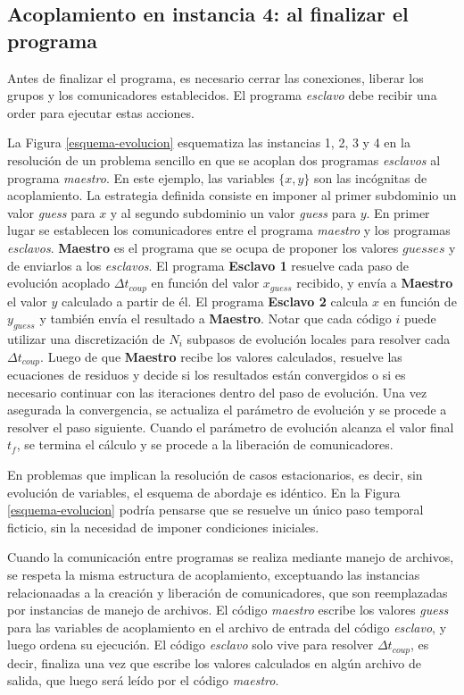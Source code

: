 \subsection*{Acoplamiento en instancia 4: al finalizar el programa}

Antes de finalizar el programa, es necesario cerrar las conexiones, liberar los grupos y los comunicadores establecidos.
El programa \textit{esclavo} debe recibir una order para ejecutar estas acciones.

\bigskip

La Figura \ref{esquema-evolucion} esquematiza las instancias 1, 2, 3 y 4 en la resolución de un problema sencillo
en que se acoplan dos programas \textit{esclavos} al programa \textit{maestro}.
En este ejemplo, las variables $\{x,y\}$ son las incógnitas de acoplamiento.
La estrategia definida consiste en imponer al primer subdominio un valor \textit{guess} para $x$ y al segundo subdominio un valor \textit{guess} para $y$.
En primer lugar se establecen los comunicadores entre el programa \textit{maestro} y los programas \textit{esclavos}.
\textbf{Maestro} es el programa que se ocupa de proponer los valores $guesses$ y de enviarlos a los \textit{esclavos}.
El programa \textbf{Esclavo 1} resuelve cada paso de evolución acoplado $\Delta t_{coup}$ en función del valor $x_{guess}$ recibido, y envía a \textbf{Maestro} el valor $y$ calculado a partir de él.
El programa \textbf{Esclavo 2} calcula $x$ en función de $y_{guess}$ y también envía el resultado a \textbf{Maestro}.
Notar que cada código $i$ puede utilizar una discretización de $N_i$ subpasos de evolución locales para resolver cada $\Delta t_{coup}$.
Luego de que \textbf{Maestro} recibe los valores calculados, 
resuelve las ecuaciones de residuos y decide si los resultados están convergidos o si es necesario continuar con las iteraciones dentro del paso de evolución.
Una vez asegurada la convergencia, se actualiza el parámetro de evolución y se procede a resolver el paso siguiente.
Cuando el parámetro de evolución alcanza el valor final $t_f$, se termina el cálculo y se procede a la liberación de comunicadores.

En problemas que implican la resolución de casos estacionarios, es decir, sin evolución de variables, el esquema de abordaje es idéntico.
En la Figura \ref{esquema-evolucion} podría pensarse que se resuelve un único paso temporal ficticio, sin la necesidad de imponer condiciones iniciales.

Cuando la comunicación entre programas se realiza mediante manejo de archivos, se respeta la misma estructura de acoplamiento,
exceptuando las instancias relacionaadas a la creación y liberación de comunicadores, que son reemplazadas por instancias de manejo de archivos.
El código \textit{maestro} escribe los valores \textit{guess} para las variables de acoplamiento en el archivo de entrada del código \textit{esclavo}, y luego ordena su ejecución.
El código \textit{esclavo} solo vive para resolver $\Delta t_{coup}$, es decir, finaliza una vez que escribe los valores calculados en algún archivo de salida,
que luego será leído por el código \textit{maestro}.

